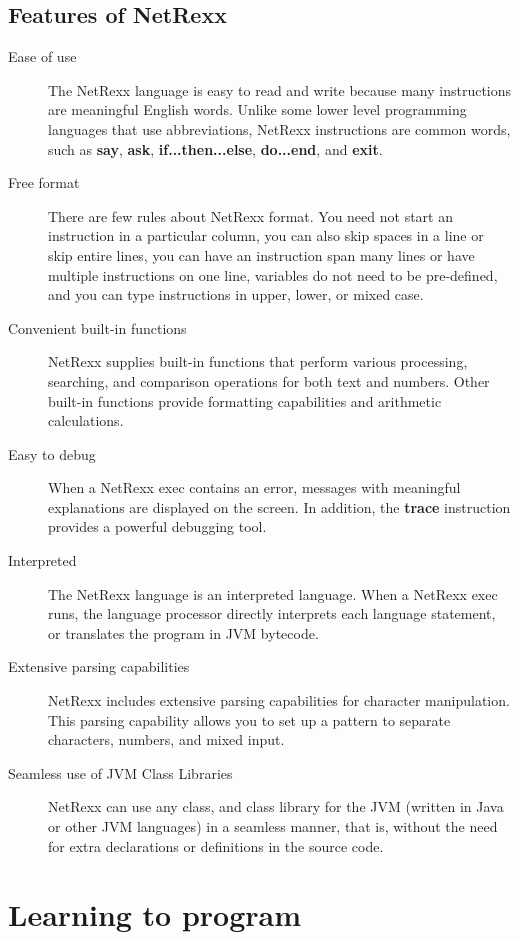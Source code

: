 \documentclass[10pt]{book}
\begin{document}
\section{Features of NetRexx}
\begin{description}
\item[Ease of use]
The NetRexx language is easy to read and write because many instructions are meaningful English words. Unlike some lower level programming languages that use abbreviations, NetRexx instructions are common words, such as \textbf{say}, \textbf{ask}, \textbf{if...then...else}, \textbf{do...end}, and \textbf{exit}.
\item[Free format] There are few rules about NetRexx format. You need not start an instruction in a particular column, you can also skip spaces in a line or skip entire lines, you can have an instruction span many lines or have multiple instructions on one line, variables do not need to be pre-defined, and you can type instructions in upper, lower, or mixed case.
\item[Convenient built-in functions] NetRexx supplies built-in functions
  that perform various processing, searching, and comparison
  operations for both text and numbers. Other built-in functions
  provide formatting capabilities and arithmetic calculations.
\item[Easy to debug]
When a NetRexx exec contains an error, messages with meaningful explanations are displayed on the screen. In addition, the \textbf{trace} instruction provides a powerful debugging tool.
\item[Interpreted]
The NetRexx language is an interpreted language. When a NetRexx exec
runs, the language processor directly interprets each language
statement, or translates the program in JVM bytecode.
\item[Extensive parsing capabilities]
NetRexx includes extensive parsing capabilities for character
manipulation. This parsing capability allows you to set up a pattern
to separate characters, numbers, and mixed input.
\item[Seamless use of JVM Class Libraries]
NetRexx can use any class, and class library for the JVM (written in
Java or other JVM languages) in a seamless manner, that is, without
the need for extra declarations or definitions in the source code.
\end{description}

\chapter{Learning to program}
\end{document}
